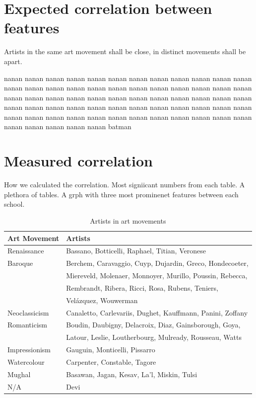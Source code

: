 \documentclass[11pt,a4paper]{report}
\begin{document}
\begin{multicols}{2}

\section{Expected correlation between features}

Artists in the same art movement shall be close, in distinct movements shall be
apart.

nanan nanan nanan nanan nanan nanan nanan nanan nanan nanan nanan nanan nanan
nanan nanan nanan nanan nanan nanan nanan nanan nanan nanan nanan nanan nanan
nanan nanan nanan nanan nanan nanan nanan nanan nanan nanan nanan nanan nanan
nanan nanan nanan nanan nanan nanan nanan nanan nanan nanan nanan nanan nanan
nanan nanan nanan nanan nanan nanan nanan nanan nanan nanan nanan nanan nanan
batman

\section{Measured correlation}

How we calculated the correlation.  Most signiicant numbers from each table.  A
plethora of tables.  A grph with three most prominenet features between each
school.

\begin{table}[htp]  %
\centering
\begin{tabular}{|l|l|}
\hline
Art Movement & Artists \\
\hline \hline
Renaissance    &  Bassano, Botticelli, Raphael, Titian, Veronese             \\
Baroque        &  Berchem, Caravaggio, Cuyp, Dujardin, Greco, Hondecoeter,   \\
               &  Miereveld, Molenaer, Monnoyer, Murillo, Poussin, Rebecca,  \\
               &  Rembrandt, Ribera, Ricci, Rosa, Rubens, Teniers,           \\
               &  Vel\'azquez, Wouwerman                                     \\
Neoclassicism  &  Canaletto, Carlevariis, Dughet, Kauffmann, Panini, Zoffany \\
Romanticism    &  Boudin, Daubigny, Delacroix, Diaz, Gainsborough, Goya,     \\
               &  Latour, Leslie, Loutherbourg, Mulready, Rousseau, Watts    \\
Impressionism  &  Gauguin, Monticelli, Pissarro                              \\
\hline
Watercolour    &  Carpenter, Constable, Tagore                               \\
Mughal         &  Basawan, Jagan, Kesav, La'l, Miskin, Tulsi                 \\
N/A            &  Devi                                                       \\
\hline
\end{tabular}
\caption{Artists in art movements}
\label{sketch}
\end{table}


\end{multicols}
\end{document}
